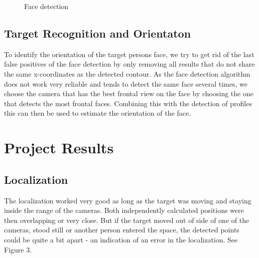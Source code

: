 \documentclass{acm_proc_article-sp}
\begin{document}
	\begin{figure}
		\hfill
		\hfill
		\hfill
		\hfill
		\caption{\label{fig:detection} Face detection}
	\end{figure}
	
\subsection{Target Recognition and Orientaton}
To identify the orientation of the target persons face, we try to get rid of the last false positives of the face detection by only removing all results that do not share the same x-coordinates as the detected contour. As the face detection algorithm does not work very reliable and tends to detect the same face several times, we choose the camera that has the best frontal view on the face by choosing the one that detects the most frontal faces. Combining this with the detection of profiles this can then be used to estimate the orientation of the face.

\section{Project Results}
\subsection{Localization}
The localization worked very good as long as the target was moving and staying inside the range of the cameras. Both independently calculated positions were then overlapping or very close. But if the target moved out of side of one of the cameras, stood still or another person entered the space, the detected points could be quite a bit apart - an indication of an error in the localization.  See Figure 3.
\end{document}

